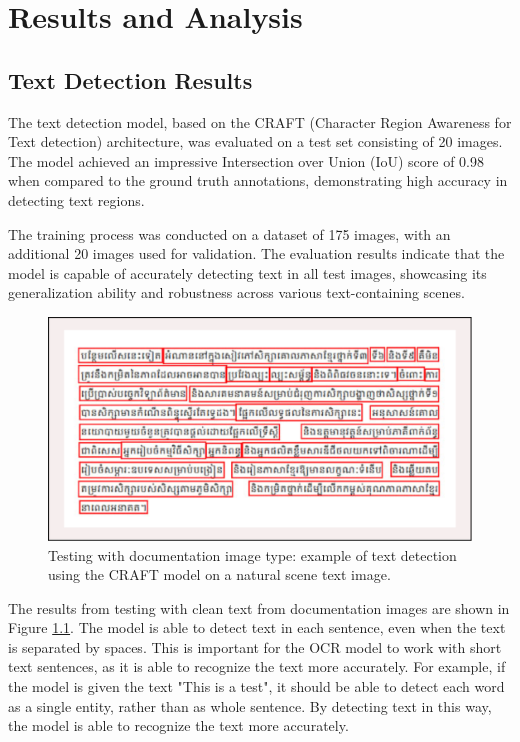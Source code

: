 \chapter{Results and Analysis}
\label{ch:results}

\section{Text Detection Results}
\label{sec:detection-results}

The text detection model, based on the CRAFT (Character Region Awareness for Text detection) 
architecture, was evaluated on a test set consisting of 20 images. The model achieved an impressive 
Intersection over Union (IoU) score of 0.98 when compared to the ground truth annotations, 
demonstrating high accuracy in detecting text regions.

The training process was conducted on a dataset of 175 images, with an additional 20 images 
used for validation. The evaluation results indicate that the model is capable of accurately 
detecting text in all test images, showcasing its generalization ability and robustness across 
various text-containing scenes.

\begin{figure}[ht]
    \centering
    \includegraphics[width=1\textwidth]{figures/image_detection_craft_01.png}
    \caption{Testing with documentation image type: example of text detection using the CRAFT 
    model on a natural scene text image.}
    \label{fig:detection-craft}
\end{figure}

The results from testing with clean text from documentation images are shown in Figure 
\ref{fig:detection-craft}. The model is able to detect text in each sentence, 
even when the text is separated by spaces. This is important for the OCR model to 
work with short text sentences, as it is able to recognize the text more accurately. 
For example, if the model is given the text "This is a test", it should be able to 
detect each word as a single entity, rather than as whole sentence. 
By detecting text in this way, the model is able to recognize the text 
more accurately.

